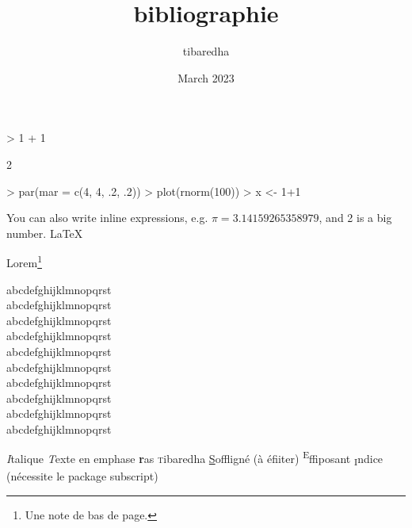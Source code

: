 \documentclass[]{article}
\title{bibliographie}
\author{tibaredha}
\date{March 2023}
\begin{document}

\maketitle





\begin{Schunk}
\begin{Sinput}
> 1 + 1
\end{Sinput}
\begin{Soutput}
[1] 2
\end{Soutput}
\begin{Sinput}
> par(mar = c(4, 4, .2, .2))
> plot(rnorm(100))
> x <- 1+1
\end{Sinput}
\end{Schunk}

You can also write inline expressions, e.g. $\pi=3.14159265358979$,
and 2 is a big number.
\LaTeX

\lipsum[1]
Lorem\footnote{Une note de bas de page.}


\tiny abcdefghijklmnopqrst\\
\scriptsize abcdefghijklmnopqrst\\
\footnotesize abcdefghijklmnopqrst\\
\small abcdefghijklmnopqrst\\
\normalsize abcdefghijklmnopqrst\\
\large abcdefghijklmnopqrst\\
\Large abcdefghijklmnopqrst\\
\LARGE abcdefghijklmnopqrst\\
\huge abcdefghijklmnopqrst\\
\Huge abcdefghijklmnopqrst\\

\normalsize


\textit Italique
\emph Texte en emphase
\textbf <U+E03A>ras
\textsc tibaredha
\underline Soffligné (à éfiiter)
\textsuperscript Effiposant
\textsubscript Indice (nécessite le package subscript)
\end{document}
